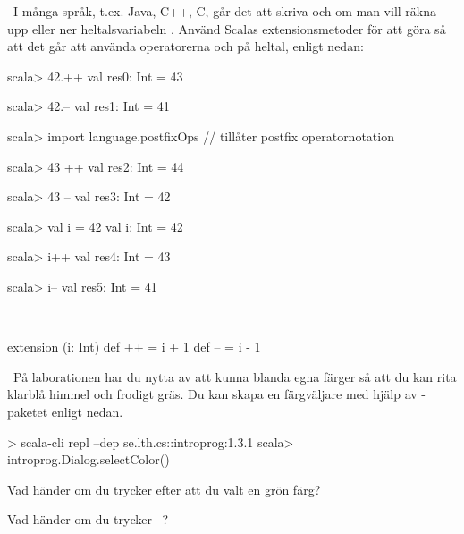 \QUESTEND



\QUESTBEGIN

\Task \what~I många språk, t.ex. Java, C++, C, går det att skriva  och  om man vill räkna upp eller ner heltalsvariabeln . Använd Scalas extensionsmetoder för att göra så att det går att använda operatorerna \code{++} och \code{--} på heltal, enligt nedan:
\begin{REPLnonum}
scala> 42.++
val res0: Int = 43

scala> 42.--
val res1: Int = 41

scala> import language.postfixOps    // tillåter postfix operatornotation

scala> 43 ++
val res2: Int = 44

scala> 43 --
val res3: Int = 42

scala> val i = 42
val i: Int = 42

scala> i++
val res4: Int = 43

scala> i--
val res5: Int = 41
\end{REPLnonum}

\SOLUTION

\TaskSolved \what~

\begin{Code}
extension (i: Int)
  def ++ = i + 1
  def -- = i - 1
\end{Code}


\QUESTEND





\QUESTBEGIN

\Task \what~På laborationen har du nytta av att kunna blanda egna färger så att du kan rita klarblå himmel och frodigt gräs. Du kan skapa en färgväljare med hjälp av -paketet enligt nedan.
\begin{REPL}
> scala-cli repl --dep se.lth.cs::introprog:1.3.1
scala> introprog.Dialog.selectColor()
\end{REPL}

\Subtask Vad händer om du trycker  efter att du valt en grön färg?

\Subtask Vad händer om du trycker ~?

